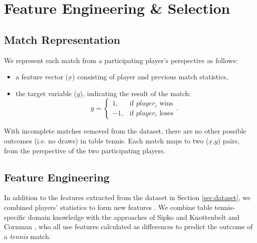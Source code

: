 \section{Feature Engineering \& Selection} \label{features}

\subsection{Match Representation}
We represent each match from a participating player's perspective as follows:
\begin{itemize}
    \item a feature vector ($\underline{x}$) consisting of player and previous match statistics,
    \item{
     the target variable ($y$), indicating the result of the match: %
     \begin{equation}
        y =
        \begin{cases}
        1, &\text{if $player_i$ wins} \\ 
        -1, &\text{if $player_i$ loses}
        \end{cases}.
    \end{equation}
     }
\end{itemize}



With incomplete matches removed from the dataset, there are no other possible outcomes (i.e. no draws) in table tennis. Each match maps to two ($\underline{x}$,$y$) pairs, from the perspective of the two participating players.

\subsection{Feature Engineering}
\label{sec:engineer}
In addition to the features extracted from the dataset in Section \ref{sec:dataset}, we combined players' statistics to form new features \cite{barnett2005combining}. We combine table tennis-specific domain knowledge with the approaches of Sipko and Knottenbelt \cite{sipko2015machine} and Cornman \etal \cite{cornman2017machine}, who all use features calculated as differences to predict the outcome of a \textit{tennis} match.

